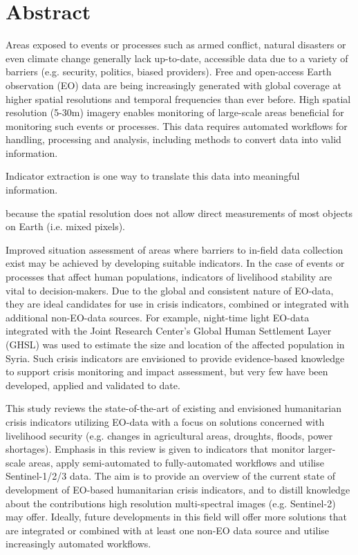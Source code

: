 \begingroup
\let\clearpage\relax
\let\cleardoublepage\relax
\let\cleardoublepage\relax

\chapter*{Abstract}

Areas exposed to events or processes such as armed conflict, natural disasters or even climate change generally lack up-to-date, accessible data due to a variety of barriers (e.g. security, politics, biased providers). Free and open-access Earth observation (EO) data are being increasingly generated with global coverage at higher spatial resolutions and temporal frequencies than ever before. High spatial resolution (5-30m) imagery enables monitoring of large-scale areas beneficial for monitoring such events or processes. This data requires automated workflows for handling, processing and analysis, including methods to convert data into valid information.

Indicator extraction is one way to translate this data into meaningful information.

because the spatial resolution does not allow direct measurements of most objects on Earth (i.e. mixed pixels).

Improved situation assessment of areas where barriers to in-field data collection exist may be achieved by developing suitable indicators. In the case of events or processes that affect human populations, indicators of livelihood stability are vital to decision-makers. Due to the global and consistent nature of EO-data, they are ideal candidates for use in crisis indicators, combined or integrated with additional non-EO-data sources.  For example, night-time light EO-data integrated with the Joint Research Center’s Global Human Settlement Layer (GHSL) was used to estimate the size and location of the affected population in Syria. Such crisis indicators are envisioned to provide evidence-based knowledge to support crisis monitoring and impact assessment, but very few have been developed, applied and validated to date.

This study reviews the state-of-the-art of existing and envisioned humanitarian crisis indicators utilizing EO-data with a focus on solutions concerned with livelihood security (e.g. changes in agricultural areas, droughts, floods, power shortages). Emphasis in this review is given to indicators that monitor larger-scale areas, apply semi-automated to fully-automated workflows and utilise Sentinel-1/2/3 data. The aim is to provide an overview of the current state of development of EO-based humanitarian crisis indicators, and to distill knowledge about the contributions high resolution multi-spectral images (e.g. Sentinel-2) may offer. Ideally, future developments in this field will offer more solutions that are integrated or combined with at least one non-EO data source and utilise increasingly automated workflows.

